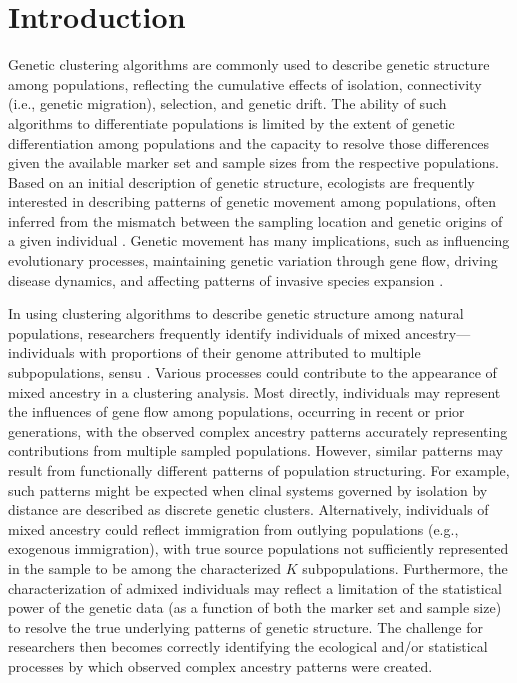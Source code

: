 
\section*{Introduction}

Genetic clustering algorithms are commonly used to describe genetic structure among populations, reflecting the cumulative
effects of isolation, connectivity (i.e., genetic migration), selection, and genetic drift.  The ability of such algorithms to differentiate populations
is limited by the extent of genetic differentiation among populations and the capacity to resolve those differences given the available marker
set and sample sizes from the respective populations.  Based on an initial description of genetic structure, ecologists are frequently
interested in describing patterns of genetic movement among populations, often inferred from the mismatch between the sampling location
and genetic origins of a given individual \citep{paetkau1995microsatellite,wilson2003bayesian}.  Genetic movement has many implications,
such as influencing evolutionary processes, maintaining genetic variation through gene flow, driving disease dynamics, and affecting patterns
of invasive species expansion \citep{huestis2019windborne, estoup2010reconstructing}.

In using clustering algorithms to describe genetic structure among natural populations, researchers frequently identify individuals of
mixed ancestry---individuals with proportions of their genome attributed to multiple subpopulations, sensu \citet{pritchard2000inference}.
Various processes could contribute to the appearance of mixed ancestry in a clustering analysis.  Most directly, individuals may represent the
influences of gene flow among populations, occurring in recent or prior generations, with the observed complex ancestry patterns accurately
representing contributions from multiple sampled populations.  However, similar patterns may result from functionally different patterns of
population structuring.  For example, such patterns might be expected when clinal systems governed by isolation by distance are described
as discrete genetic clusters.
Alternatively, individuals of mixed ancestry could reflect immigration from outlying populations (e.g., exogenous immigration), with true source
populations not sufficiently
represented in the sample to be among the characterized $K$ subpopulations.
Furthermore, the characterization of admixed individuals may reflect a limitation of the statistical power of the genetic data (as a function of both the marker set and sample size) to resolve the true underlying patterns of genetic structure.
 The challenge for researchers then becomes correctly identifying the ecological and/or statistical processes by which observed complex
 ancestry patterns were created.

